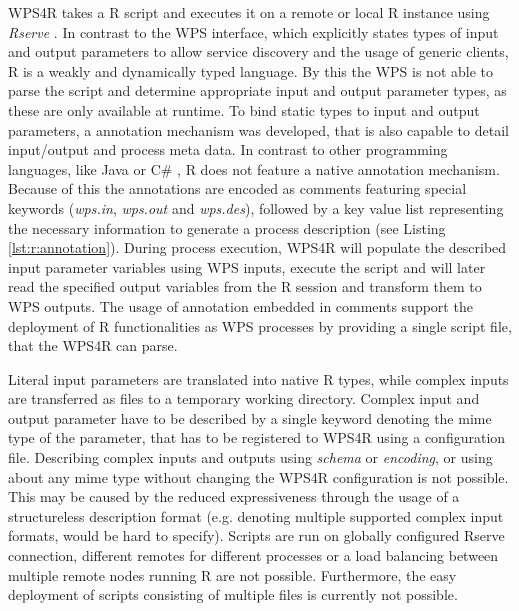 	WPS4R takes a R script and executes it on a remote or local R instance using \emph{Rserve} \citep{rserve}. In contrast to the \ac{WPS} interface, which explicitly states types of input and output parameters to allow service discovery and the usage of generic clients, R is a weakly and dynamically typed language. By this the \ac{WPS} is not able to parse the script and determine appropriate input and output parameter types, as these are only available at runtime. To bind static types to input and output parameters, a annotation mechanism was developed, that is also capable to detail input/output and process meta data. In contrast to other programming languages, like Java \citep{jsr175} or C\# \citep{ecma335}, R does not feature a native annotation mechanism. Because of this the annotations are encoded as comments featuring special keywords (\emph{wps.in}, \emph{wps.out} and \emph{wps.des}), followed by a key value list representing the necessary information to generate a process description (see Listing \ref{lst:r:annotation}). During process execution, WPS4R will populate the described input parameter variables using \ac{WPS} inputs, execute the script and will later read the specified output variables from the R session and transform them to WPS outputs. The usage of annotation embedded in comments support the deployment of R functionalities as WPS processes by providing a single script file, that the WPS4R can parse.

	Literal input parameters are translated into native R types, while complex inputs are transferred as files to a temporary working directory. Complex input and output parameter have to be described by a single keyword denoting the mime type of the parameter, that has to be registered to WPS4R using a configuration file. Describing complex inputs and outputs using \emph{schema} or \emph{encoding}, or using about any mime type without changing the WPS4R configuration is not possible. This may be caused by the reduced expressiveness through the usage of a structureless description format (e.g. denoting multiple supported complex input formats, would be hard to specify). Scripts are run on globally configured Rserve connection, different remotes for different processes or a load balancing between multiple remote nodes running R are not possible. Furthermore, the easy deployment of scripts consisting of multiple files is currently not possible.


